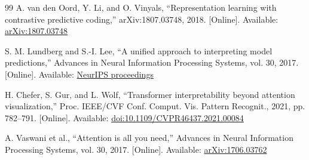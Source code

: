 \documentclass[conference,letterpaper]{IEEEtran}
\begin{document}
\begin{thebibliography}{99}
A. van den Oord, Y. Li, and O. Vinyals, ``Representation learning with contrastive predictive coding,'' arXiv:1807.03748, 2018. [Online]. Available: \href{https://arxiv.org/abs/1807.03748}{arXiv:1807.03748}

S. M. Lundberg and S.-I. Lee, ``A unified approach to interpreting model predictions,'' Advances in Neural Information Processing Systems, vol. 30, 2017. [Online]. Available: \href{https://papers.nips.cc/paper_files/paper/2017/hash/8a20a8621978632d76c43dfd28b67767-Abstract.html}{NeurIPS proceedings}

H. Chefer, S. Gur, and L. Wolf, ``Transformer interpretability beyond attention visualization,'' Proc. IEEE/CVF Conf. Comput. Vis. Pattern Recognit., 2021, pp. 782--791. [Online]. Available: \href{https://doi.org/10.1109/CVPR46437.2021.00084}{doi:10.1109/CVPR46437.2021.00084}

A. Vaswani et al., ``Attention is all you need,'' Advances in Neural Information Processing Systems, vol. 30, 2017. [Online]. Available: \href{https://arxiv.org/abs/1706.03762}{arXiv:1706.03762}

\end{thebibliography}
\end{document}
